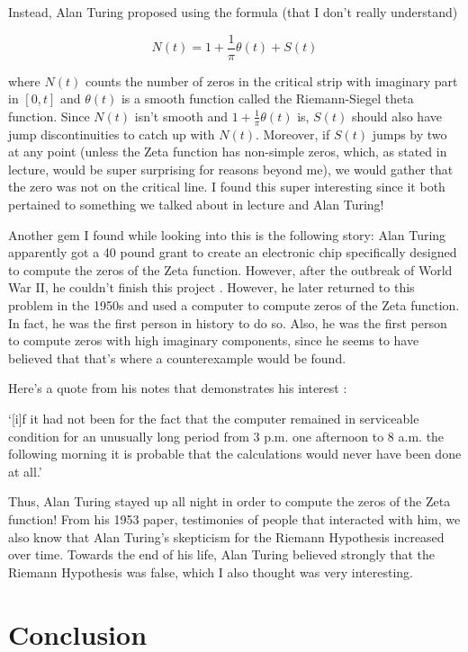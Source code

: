 \documentclass{article}
\theoremstyle{definition}
\begin{document}
Instead, Alan Turing proposed using the formula (that I don't really understand)

\[ N(t) = 1 + \frac{1}{\pi} \theta(t) + S(t) \]

where $N(t)$ counts the number of zeros in the critical strip with imaginary part 
in $ [0,t] $ and  $ \theta(t) $ is a smooth function called the Riemann-Siegel theta function.
Since $ N(t) $ isn't smooth and $ 1 + \frac{1}{\pi} \theta(t) $ is, $ S(t) $ should 
also have jump discontinuities to catch up with $ N(t) $. Moreover, if $ S(t) $ jumps 
by two at any point (unless the Zeta function has non-simple zeros, which, as stated in lecture,
would be super surprising for reasons beyond me), we would gather that the zero was not on the
critical line. I found this super interesting since it both pertained to something we talked about
in lecture and Alan Turing!

Another gem I found while looking into this is the following story: 
Alan Turing apparently got a 40 pound grant to create an electronic chip
specifically designed to compute the zeros of the Zeta function. However, after the
outbreak of World War II, he couldn't finish this project \cite{hejhal_alan_2012}.
However, he later returned to this problem in the 1950s and used a computer to 
compute zeros of the Zeta function. In fact, he was the first person in history to do so.
Also, he was the first person to compute zeros with high imaginary components, since he seems
to have believed that that's where a counterexample would be found.

Here's a quote from his notes that demonstrates his interest \cite{hejhal_alan_2012}:

`[i]f it had not been for the fact that the computer remained in serviceable condition for an unusually long period from 3 p.m. one afternoon to 8 a.m. the
 following morning it is probable that the calculations would never have been done at all.'

Thus, Alan Turing stayed up all night in order to compute the zeros of the Zeta function! From his 1953 paper,
testimonies of people that interacted with him, we also know that Alan Turing's skepticism for the Riemann Hypothesis
increased over time. Towards the end of his life, Alan Turing believed strongly that the Riemann Hypothesis was false,
which I also thought was very interesting.

\section{Conclusion}
\end{document}
